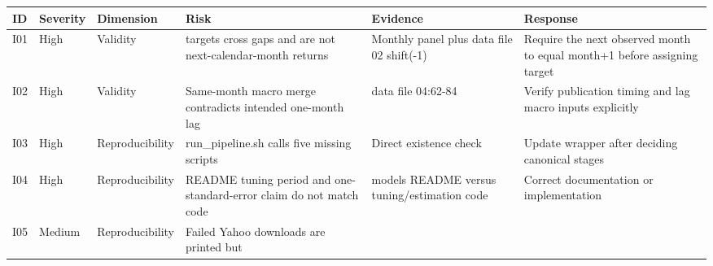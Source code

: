 \documentclass[
  11pt,
  a4paper]{article}
\newcounter{none} %
\begin{document}
{\def\LTcaptype{none} %
\begin{landscape}
\scriptsize
\begin{longtable}[]{@{}
  >{\raggedright\arraybackslash}p{}
  >{\raggedright\arraybackslash}p{}
  >{\raggedright\arraybackslash}p{}
  >{\raggedright\arraybackslash}p{}
  >{\raggedright\arraybackslash}p{}
  >{\raggedright\arraybackslash}p{}@{}}
\toprule\noalign{}
\begin{minipage}[b]{\linewidth}\raggedright
ID
\end{minipage} & \begin{minipage}[b]{\linewidth}\raggedright
Severity
\end{minipage} & \begin{minipage}[b]{\linewidth}\raggedright
Dimension
\end{minipage} & \begin{minipage}[b]{\linewidth}\raggedright
Risk
\end{minipage} & \begin{minipage}[b]{\linewidth}\raggedright
Evidence
\end{minipage} & \begin{minipage}[b]{\linewidth}\raggedright
Response
\end{minipage} \\
\midrule\noalign{}
\endhead
\bottomrule\noalign{}
\endlastfoot
I01 & High & Validity & 26 targets cross gaps and are not
next-calendar-month returns & Monthly panel plus data file 02 shift(-1)
& Require the next observed month to equal month+1 before assigning
target \\
I02 & High & Validity & Same-month macro merge contradicts intended
one-month lag & data file 04:62-84 & Verify publication timing and lag
macro inputs explicitly \\
I03 & High & Reproducibility & run\_\allowbreak{}pipeline.sh calls five missing
scripts & Direct existence check & Update wrapper after deciding
canonical stages \\
I04 & High & Reproducibility & README tuning period and
one-standard-error claim do not match code & models README versus
tuning/estimation code & Correct documentation or implementation \\
I05 & Medium & Reproducibility & Failed Yahoo downloads are printed but

\end{longtable}
\end{landscape}}
\end{document}
